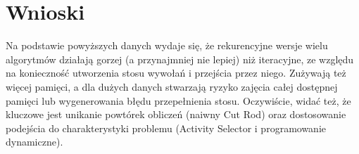 \documentclass{article}
\begin{document}
\section{Wnioski}

Na podstawie powyższych danych wydaje się, że rekurencyjne wersje wielu algorytmów działają gorzej (a przynajmniej nie lepiej) niż iteracyjne, ze względu na konieczność utworzenia stosu wywołań i przejścia przez niego. Zużywają też więcej pamięci, a dla dużych danych stwarzają ryzyko zajęcia całej dostępnej pamięci lub wygenerowania błędu przepełnienia stosu. Oczywiście, widać też, że kluczowe jest unikanie powtórek obliczeń (naiwny Cut Rod) oraz dostosowanie podejścia do charakterystyki problemu (Activity Selector i programowanie dynamiczne).
\end{document}

